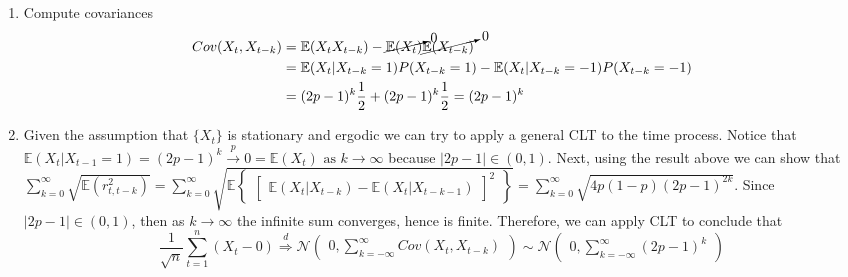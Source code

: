 \documentclass[]{article}
\begin{document}
\begin{enumerate}[label=\alph*)]
	\item Compute covariances
	\begin{equation}
		\begin{split}
		Cov(X_t, X_{t-k})& = \mathbb{E}(X_t X_{t-k})-\cancelto{0}{\mathbb{E}(X_t)}\cancelto{0}{\mathbb{E}(X_{t-k})} \\ \nonumber
		& = \mathbb{E}(X_t|X_{t-k}=1)P(X_{t-k}=1)-\mathbb{E}(X_t|X_{t-k}=-1)P(X_{t-k}=-1) \\
		& = (2p-1)^k\frac{1}{2}+(2p-1)^k\frac{1}{2} = (2p-1)^k
		\end{split}
	\end{equation}
	
	\item Given the assumption that $\{X_t\}$ is stationary and ergodic we can try to apply a general CLT to the time process. Notice that $\mathbb{E}(X_t|X_{t-1}=1)=(2p-1)^k\overset{p}{\longrightarrow}0=\mathbb{E}(X_t)\text{ as } k\to\infty$ because $\mid2p-1\mid\in(0,1)$. Next, using the result above we can show that $\sum_{k=0}^{\infty}\sqrt{\mathbb{E}(r_{t, t-k}^{2})} = \sum_{k=0}^{\infty}\sqrt{\mathbb{E}\begin{Bmatrix}\begin{bmatrix}\mathbb{E}(X_t|X_{t-k})-\mathbb{E}(X_t|X_{t-k-1})\end{bmatrix}^2\end{Bmatrix}} = \sum_{k=0}^{\infty}\sqrt{4p(1-p)(2p-1)^{2k}}$. Since $\mid2p-1\mid\in(0,1)$, then as $k\to\infty$ the infinite sum converges, hence is finite. Therefore, we can apply CLT to conclude that 
	\begin{equation}
		\frac{1}{\sqrt{n}}\sum_{t=1}^{n}(X_t-0)\overset{d}{\Longrightarrow}\mathcal{N}\begin{pmatrix}0, \sum\limits_{k=-\infty}^{\infty}Cov(X_t, X_{t-k})\end{pmatrix} \sim \mathcal{N}\begin{pmatrix}0, \sum\limits_{k=-\infty}^{\infty}(2p-1)^k\end{pmatrix}\nonumber
	\end{equation}
	

\end{enumerate}
\end{document}
